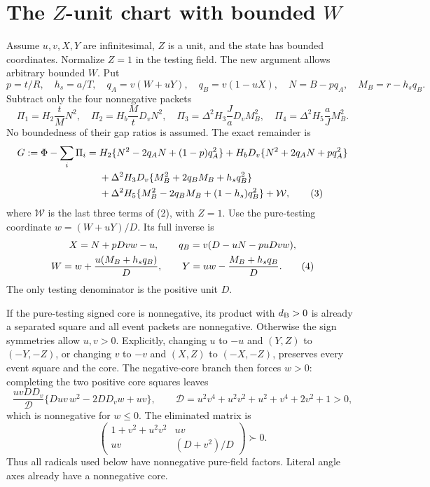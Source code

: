 \section{The \texorpdfstring{$Z$}{Z}-unit chart with bounded \texorpdfstring{$W$}{W}}

Assume $u,v,X,Y$ are infinitesimal, $Z$ is a unit, and the state has
bounded coordinates. Normalize $Z=1$ in the testing field. The new
argument allows arbitrary bounded $W$. Put
\[
 p=t/R,\quad h_s=a/T,\quad q_A=v(W+uY),\quad q_B=v(1-uX),
 \quad N=B-pq_A,\quad M_B=r-h_sq_B.
\]
Subtract only the four nonnegative packets
\[
 \Pi_1=H_2\frac tM N^2,\quad \Pi_2=H_b\frac MtD_vN^2,
 \quad \Pi_3=\Delta^2H_3\frac JaD_vM_B^2,
 \quad \Pi_4=\Delta^2H_5\frac aJM_B^2.
\]
No boundedness of their gap ratios is assumed. The exact remainder is
\begin{align}
 G:=\Phi-\sum_i\Pi_i={}&H_2\{N^2-2q_AN+(1-p)q_A^2\}
 +H_bD_v\{N^2+2q_AN+pq_A^2\}\notag\\
 &+\Delta^2H_3D_v\{M_B^2+2q_BM_B+h_sq_B^2\}\notag\\
 &+\Delta^2H_5\{M_B^2-2q_BM_B+(1-h_s)q_B^2\}
 +\mathcal W,                                                   \tag{3}
\end{align}
where $\mathcal W$ is the last three terms of (2), with $Z=1$.
Use the pure-testing coordinate $w=(W+uY)/D$. Its full inverse is
\begin{gather}
 X=N+pDvw-u,\qquad q_B=v(D-uN-puDvw),\notag\\
 W=w+\frac{u(M_B+h_sq_B)}D,\qquad
 Y=uw-\frac{M_B+h_sq_B}D.                               \tag{4}
\end{gather}
The only testing denominator is the positive unit $D$.

If the pure-testing signed core is nonnegative, its product with
$d_{\rm B}>0$ is already a separated square and all event packets are
nonnegative. Otherwise the sign symmetries allow $u,v>0$. Explicitly,
changing $u$ to $-u$ and $(Y,Z)$ to $(-Y,-Z)$, or changing $v$ to
$-v$ and $(X,Z)$ to $(-X,-Z)$, preserves every event square and the
core. The negative-core branch then forces $w>0$: completing the two
positive core squares leaves
\[
 \frac{uvDD_v}{\mathcal D}
 \{D u v\,w^2-2DD_vw+uv\},\qquad
 \mathcal D=u^2v^4+u^2v^2+u^2+v^4+2v^2+1>0,
\]
which is nonnegative for $w\leq0$. The eliminated matrix is
\[
 \begin{pmatrix}1+v^2+u^2v^2&uv\\uv&(D+v^2)/D\end{pmatrix}\succ0.
\]
Thus all radicals used below have nonnegative pure-field factors.
Literal angle axes already have a nonnegative core.


